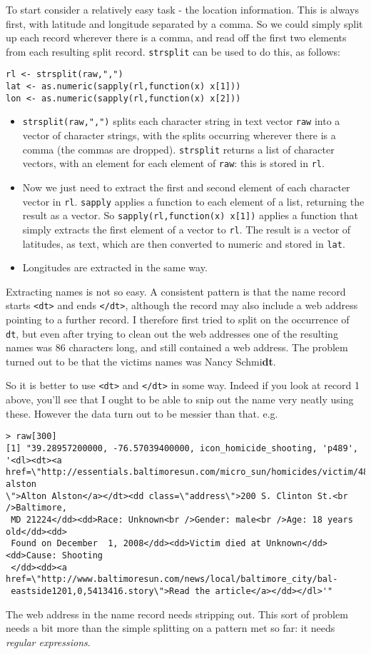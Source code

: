 \documentclass[10pt] {article}
\theoremstyle{definition}
\begin{document}
To start consider a relatively easy task - the location information. This is always first, with latitude and longitude separated by a comma. So we could simply split up each record wherever there is a comma, and read off the first two elements from each resulting split record. \lstinline+strsplit+ can be used to do this, as follows: 
\begin{lstlisting}
rl <- strsplit(raw,",")
lat <- as.numeric(sapply(rl,function(x) x[1]))
lon <- as.numeric(sapply(rl,function(x) x[2]))
\end{lstlisting}
\begin{itemize}
\item \lstinline+strsplit(raw,",")+ splits each character string in text vector {\tt raw} into a vector of character strings, with the splits occurring wherever there is a comma (the commas are dropped). {\tt strsplit} returns a list of character vectors, with an element for each element of {\tt raw}: this is stored in {\tt rl}.
\item Now we just need to extract the first and second element of each character vector in {\tt rl}. {\tt sapply} applies a function to each element of a list, returning the result as a vector. So \lstinline+sapply(rl,function(x) x[1])+ applies a function that simply extracts the first element of a vector to {\tt rl}. The result is a vector of latitudes, as text, which are then converted to numeric and stored in {\tt lat}. 
\item Longitudes are extracted in the same way.  
\end{itemize}

Extracting names is not so easy. A consistent pattern is that the name record starts \lstinline+<dt>+ and ends \lstinline+</dt>+, although the record may also include a web address pointing to a further record. I therefore first tried to split on the occurrence of \lstinline+dt+, but even after trying to clean out the web addresses one of the resulting names was 86 characters long, and still contained a web address. The problem turned out to be that the victims names was Nancy Schmi{\bf dt}. 

So it is better to use \lstinline+<dt>+ and \lstinline+</dt>+ in some way. Indeed if you look at record 1 above, you'll see that I ought to be able to snip out the name very neatly using these. However the data turn out to be messier than that. e.g.
\begin{lstlisting}
> raw[300]
[1] "39.28957200000, -76.57039400000, icon_homicide_shooting, 'p489', '<dl><dt><a 
href=\"http://essentials.baltimoresun.com/micro_sun/homicides/victim/489/alton-alston
\">Alton Alston</a></dt><dd class=\"address\">200 S. Clinton St.<br />Baltimore,
 MD 21224</dd><dd>Race: Unknown<br />Gender: male<br />Age: 18 years old</dd><dd>
 Found on December  1, 2008</dd><dd>Victim died at Unknown</dd><dd>Cause: Shooting
 </dd><dd><a href=\"http://www.baltimoresun.com/news/local/baltimore_city/bal-
 eastside1201,0,5413416.story\">Read the article</a></dd></dl>'"
\end{lstlisting}
The web address in the name record needs stripping out. This sort of problem needs a bit more than the simple splitting on a pattern met so far: it needs {\em regular expressions}. 
\end{document}
